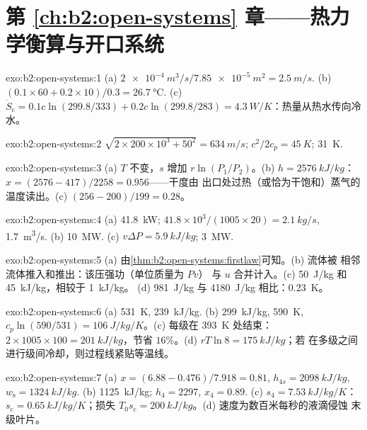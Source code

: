 \section*{第 \ref{ch:b2:open-systems} 章——热力学衡算与开口系统}

\begin{solution}{exo:b2:open-systems:1}
(a) $\qty{2e-4}{m^3/s}/\qty{7.85e-5}{m^2} = \qty{2.5}{m/s}$. (b) $(0.1 \times 60 + 0.2
\times 10)/0.3 = \qty{26.7}{\celsius}$. (c) $\dot S_{\text{c}} = 0.1c\ln(299.8/333) +
0.2c\ln(299.8/283) = \qty{4.3}{W/K}$：热量从热水传向冷水。
\end{solution}

\begin{solution}{exo:b2:open-systems:2}
$\sqrt{2 \times 200 \times 10^3 + 50^2} = \qty{634}{m/s}$; $c^2/2c_p = \qty{45}{K}$;
\qty{31}{K}.
\end{solution}

\begin{solution}{exo:b2:open-systems:3}
(a) $T$ 不变，$s$ 增加 $r\ln(P_1/P_2)$。(b) $h = \qty{2576}{kJ/kg}$：
$x = (2576 - 417)/2258 = 0.956$——干度由
出口处过热（或恰为干饱和）蒸气的温度读出。(c) $(256 -
200)/199 = 0.28$。
\end{solution}

\begin{solution}{exo:b2:open-systems:4}
(a) \qty{41.8}{kW}; $41.8 \times 10^3/(1005 \times 20) = \qty{2.1}{kg/s}$, \qty{1.7}{m^3/s}.
(b) \qty{10}{MW}. (c) $v\Delta P = \qty{5.9}{kJ/kg}$; \qty{3}{MW}.
\end{solution}

\begin{solution}{exo:b2:open-systems:5}
(a) 由\cref{thm:b2:open-systems:firstlaw}可知。(b) 流体被
相邻流体推入和推出：该压强功（单位质量为 $Pv$）
与 $u$ 合并计入。(c) \qty{50}{J/kg} 和 \qty{45}{kJ/kg}，相较于 \qty{1}{kJ/kg}。
(d) \qty{981}{J/kg} 与 \qty{4180}{J/kg} 相比：\qty{0.23}{K}。
\end{solution}

\begin{solution}{exo:b2:open-systems:6}
(a) \qty{531}{K}, \qty{239}{kJ/kg}. (b) \qty{299}{kJ/kg}, \qty{590}{K}, $c_p\ln(590/531)
= \qty{106}{J/kg/K}$。(c) 每级在 \qty{393}{K} 处结束：$2 \times 1005 \times 100 =
\qty{201}{kJ/kg}$，节省 $16\%$。(d) $rT\ln 8 = \qty{175}{kJ/kg}$；若
在多级之间进行级间冷却，则过程线紧贴等温线。
\end{solution}

\begin{solution}{exo:b2:open-systems:7}
(a) $x = (6.88 - 0.476)/7.918 = 0.81$, $h_{4s} = \qty{2098}{kJ/kg}$, $w_{\text{s}} =
\qty{1324}{kJ/kg}$. (b) \qty{1125}{kJ/kg}; $h_4 = 2297$, $x_4 = 0.89$. (c) $s_4 =
\qty{7.53}{kJ/kg/K}$：$s_{\text{c}} = \qty{0.65}{kJ/kg/K}$；损失 $T_0s_{\text{c}} =
\qty{200}{kJ/kg}$。(d) 速度为数百米每秒的液滴侵蚀
末级叶片。
\end{solution}

